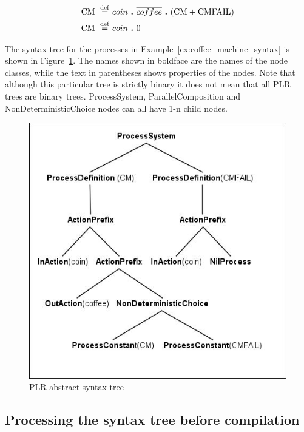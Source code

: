 	\begin{Exa}
	\label{ex:coffee_machine_syntax}
	\begin{align*}
			\mathrm{CM} \ \stackrel{\mathrm{def}}{=}\  & coin \ \textbf{.}\  \overline{coffee} \ \textbf{.}\  (\mathrm{CM}+\mathrm{CMFAIL})\\
			\mathrm{CM} \ \stackrel{\mathrm{def}}{=}\  & coin \ \textbf{.}\  \mathrm{0}
	\end{align*}	
	\end{Exa}

	The syntax tree for the processes in Example~\ref{ex:coffee_machine_syntax} 
	is shown in Figure~\ref{fig:syntax_tree_example}. The names shown in 
	boldface are the names of the node classes, while the text in 
	parentheses shows properties of the nodes. Note that although this 
	particular tree is strictly binary it does not mean that all PLR trees
	are binary trees. \textsf{ProcessSystem}, \textsf{ParallelComposition} and 
	\textsf{NonDeterministicChoice} nodes can all have 1-n child nodes.
	
	
	\begin{figure}[h!]
		\centering
		\includegraphics[scale=0.7]{syntax_tree_example.jpg}
		\caption{PLR abstract syntax tree}
		\label{fig:syntax_tree_example}
	\end{figure}
 	

\subsection{Processing the syntax tree before compilation}
	
